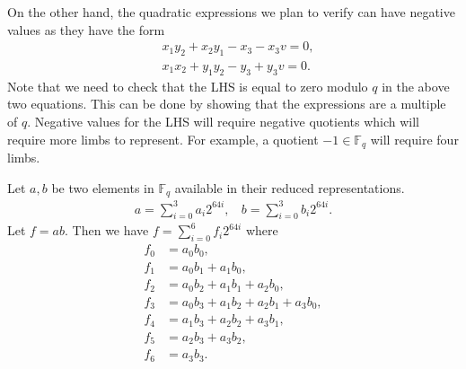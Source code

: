 \documentclass[a4paper, 12pt]{article}
\begin{document}
On the other hand, the quadratic expressions we plan to verify can have negative values as they have the form
\begin{align*}
  & x_1y_2 + x_2y_1 -x_3 - x_3 v = 0,\\
  & x_1x_2 + y_1y_2 -y_3 + y_3 v = 0.
\end{align*}
Note that we need to check that the LHS is equal to zero modulo $q$ in the above two equations. This can be done by showing that the expressions are a multiple of $q$. Negative values for the LHS will require negative quotients which will require more limbs to represent. For example, a quotient $-1 \in \mathbb{F}_q$ will require four limbs.

Let $a,b$ be two elements in $\mathbb{F}_q$ available in their reduced representations.
\begin{align*}
  a = \sum^{3}_{i=0} a_i 2^{64i}, \ \ \ \ b = \sum^{3}_{i=0} b_i 2^{64i}.
\end{align*}
Let $f = ab$. Then we have $f = \sum_{i=0}^{6} f_i 2^{64i}$ where
\begin{align*}
  f_0 & = a_0b_0,\\
  f_1 & = a_0b_1 + a_1b_0,\\
  f_2 & = a_0b_2 + a_1b_1 + a_2b_0,\\
  f_3 & = a_0b_3 + a_1b_2 + a_2b_1 + a_3b_0,\\
  f_4 & = a_1b_3 + a_2b_2 + a_3b_1,\\
  f_5 & = a_2b_3 + a_3b_2,\\
  f_6 & = a_3b_3.
\end{align*}
\end{document}
